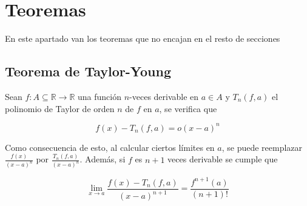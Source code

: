 \section{Teoremas}

En este apartado van los teoremas que no encajan en el resto de secciones

\subsection{Teorema de Taylor-Young}
\label{T:Taylor-Young}
Sean $f:A\subseteq \mathbb{R} \to \mathbb{R}$ una función $n$-veces derivable en $a\in A$ y $T_n(f,a)$ el polinomio de Taylor de orden $n$ de $f$ en $a$, se verifica que

\[f(x)-T_n(f,a)=o(x-a)^n\]

Como consecuencia de esto, al calcular ciertos límites en $a$, se puede reemplazar $\frac{f(x)}{(x-a)^n}$ por $\frac{T_n(f,a)}{(x-a)^n}$. Además, si $f$ es $n+1$ veces derivable se cumple que

\[\lim_{x\to a}\frac{f(x)-T_n(f,a)}{(x-a)^{n+1}}=\frac{f^{n+1}(a)}{(n+1)!}\]

\newpage